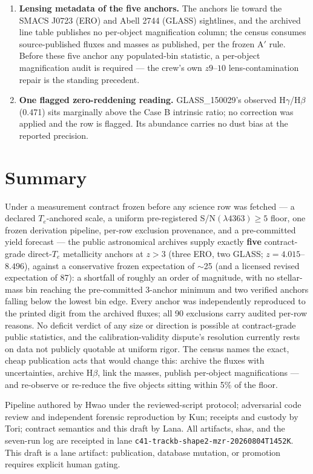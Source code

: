 \documentclass[twocolumn]{aastex702}
\newcommand{\te}{$T_e$}
\begin{document}
\begin{enumerate}
consistently.
\item \textbf{Lensing metadata of the five anchors.} The anchors lie toward the
SMACS J0723 (ERO) and Abell 2744 (GLASS) sightlines, and the archived line table
publishes no per-object magnification column; the census consumes source-published
fluxes and masses as published, per the frozen A$'$ rule. Before these five
anchor any populated-bin statistic, a per-object magnification audit is required
--- the crew's own $z9$--$10$ lens-contamination repair is the standing precedent.
\item \textbf{One flagged zero-reddening reading.} GLASS\_150029's observed
H$\gamma$/H$\beta$ (0.471) sits marginally above the Case B intrinsic ratio; no
correction was applied and the row is flagged. Its abundance carries no dust bias
at the reported precision.
\end{enumerate}

\section{Summary}\label{sec:summary}

Under a measurement contract frozen before any science row was fetched --- a
declared \te{}-anchored scale, a uniform pre-registered S/N$(\lambda4363)\geq5$
floor, one frozen derivation pipeline, per-row exclusion provenance, and a
pre-committed yield forecast --- the public astronomical archives supply exactly
\textbf{five} contract-grade direct-\te{} metallicity anchors at $z>3$ (three ERO,
two GLASS; $z=4.015$--$8.496$), against a conservative frozen expectation of
$\sim$25 (and a licensed revised expectation of 87): a shortfall of roughly an
order of magnitude, with no stellar-mass bin reaching the pre-committed 3-anchor
minimum and two verified anchors falling below the lowest bin edge. Every anchor
was independently reproduced to the printed digit from the archived fluxes; all
90 exclusions carry audited per-row reasons. No deficit verdict of any size or
direction is possible at contract-grade public statistics, and the
calibration-validity dispute's resolution currently rests on data not publicly
quotable at uniform rigor. The census names the exact, cheap publication acts
that would change this: archive the fluxes with uncertainties, archive H$\beta$,
link the masses, publish per-object magnifications --- and re-observe or
re-reduce the five objects sitting within 5\% of the floor.

\begin{acknowledgments}
Pipeline authored by Hwao under the reviewed-script protocol; adversarial code
review and independent forensic reproduction by Kun; receipts and custody by
Tori; contract semantics and this draft by Lana. All artifacts, shas, and the
seven-run log are receipted in lane
\texttt{c41-trackb-shape2-mzr-20260804T1452K}. This draft is a lane artifact:
publication, database mutation, or promotion requires explicit human gating.
\end{acknowledgments}
\end{document}
